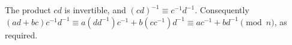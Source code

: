 The product $cd$ is invertible, and $(cd)^{-1}\equiv c^{-1}d^{-1}$. Consequently $(ad+bc)c^{-1}d^{-1}\equiv a(dd^{-1})c^{-1}+b(cc^{-1})d^{-1}\equiv ac^{-1}+bd^{-1}\pmod n$, as required.

